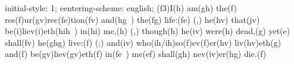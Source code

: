 initial-style: 1;
centering-scheme: english;
(f3)I(h) am(gh) the(f) res(f)ur(gv)rec(fe)tion(fv) and(hg~) the(fg) life:(fe) (,) he(hv) that(jv) be(i)liev(i)eth(hih~) in(hi) me,(h) (,) though(h) he(iv) were(h) dead,(g) yet(e) shall(fv) he(ghg) live:(f) (;) and(iv) who(ih/ih)so(f)ev(f)er(hv) liv(hv)eth(g) and(f) be(gv)liev(gv)eth(f) in(fe~) me(ef) shall(gh) nev(iv)er(hg) die.(f)
